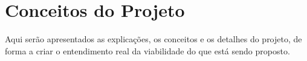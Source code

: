 \chapter{Conceitos do Projeto}
\par Aqui serão apresentados as explicações, os conceitos e os detalhes do projeto, de forma a criar o entendimento real da viabilidade do que está sendo proposto.





